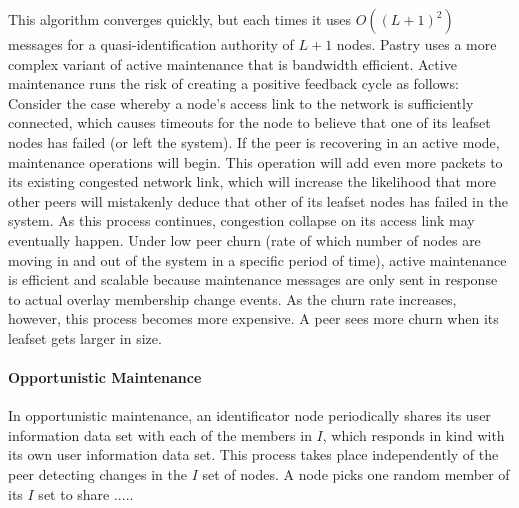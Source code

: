  This algorithm converges quickly, but each times it uses $O((L+1)^2)$ messages
for a quasi-identification authority of $L+1$ nodes.
Pastry uses a more complex variant of active maintenance that is
bandwidth efficient.
Active maintenance runs the risk of creating a positive feedback cycle as
follows: Consider the case whereby a node's access link to the network is
sufficiently connected, which causes timeouts for the node to believe that one
of its leafset nodes has failed (or left the system). If the peer is recovering
in an active mode, maintenance operations will begin. This operation will add
even more packets to its existing congested network link, which will increase
the likelihood that more other peers will mistakenly deduce that other of its leafset
nodes has failed in the system. As this process continues, congestion collapse
on its access link may eventually happen.
Under low peer churn (rate of which number of nodes are moving in and out of the
system in a specific period of time), active maintenance is efficient and scalable because
maintenance messages are only sent in response to actual overlay membership
change events. As the churn rate increases, however, this process becomes more
expensive. A peer sees more churn when its leafset gets larger in size.


\paragraph{Opportunistic Maintenance}

In opportunistic maintenance, an identificator node periodically shares its user information
data set with each of the members in $I$, which responds in kind with its own
user information data set. This process takes place independently of the peer
detecting changes in the $I$ set of nodes. A node picks one random member of
its $I$ set to share .....

